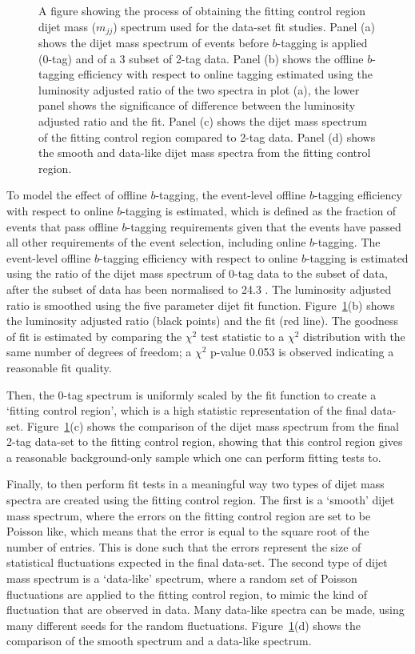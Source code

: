 \begin{figure}[!htb]
\caption{\label{fig:fittingCR}
  A figure showing the process of obtaining the fitting control region dijet mass ($m_{jj}$) spectrum
  used for the \lm{} data-set fit studies.
  Panel (a) shows the dijet mass spectrum of events before $b$-tagging is applied (0-tag) and of a 3 \ifb{} subset of 2-tag data.
  Panel (b) shows the offline $b$-tagging efficiency with respect to online tagging estimated using the luminosity adjusted ratio of the two spectra in plot (a),
  the lower panel shows the significance of difference between the luminosity adjusted ratio and the fit.
  Panel (c) shows the dijet mass spectrum of the fitting control region compared to 2-tag data.
  Panel (d) shows the smooth and data-like dijet mass spectra from the fitting control region.
}
\end{figure}

To model the effect of offline $b$-tagging, the event-level offline $b$-tagging efficiency with respect to online $b$-tagging is estimated,
which is defined as the fraction of events that pass offline $b$-tagging requirements given
that the events have passed all other requirements of the \lm{} event selection, including online $b$-tagging.
The event-level offline $b$-tagging efficiency with respect to online $b$-tagging is estimated using the ratio
of the dijet mass spectrum of 0-tag data to the subset of data, after the subset of data has been normalised to 24.3 \ifb{}.
The luminosity adjusted ratio is smoothed using the five parameter dijet fit function.
Figure~\ref{fig:fittingCR}(b) shows the luminosity adjusted ratio (black points) and the fit (red line).
The goodness of fit is estimated by comparing the $\chi^2$ test statistic to a $\chi^2$ distribution with the same number of degrees of freedom;
a $\chi^2$ p-value 0.053 is observed indicating a reasonable fit quality.

Then, the 0-tag spectrum is uniformly scaled by the fit function to create a `fitting control region', which is a high statistic representation of the final data-set.
Figure~\ref{fig:fittingCR}(c) shows the comparison of the dijet mass spectrum from the final 2-tag data-set to the fitting control region,
showing that this control region gives a reasonable background-only sample which one can perform fitting tests to.

Finally, to then perform fit tests in a meaningful way two types of dijet mass spectra are created using the fitting control region.
The first is a `smooth' dijet mass spectrum, where the errors on the fitting control region are set to be Poisson like, which
means that the error is equal to the square root of the number of entries.
This is done such that the errors represent the  size of statistical fluctuations expected in the final data-set.
The second type of dijet mass spectrum is a `data-like' spectrum,
where a random set of Poisson fluctuations are applied to the fitting control region,
to mimic the kind of fluctuation that are observed in data.
Many data-like spectra can be made, using many different seeds for the random fluctuations.
Figure~\ref{fig:fittingCR}(d) shows the comparison of the smooth spectrum and a data-like spectrum.

